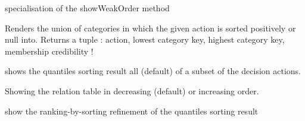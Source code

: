 \documentclass[letterpaper,10pt,english]{sphinxmanual}
\begin{document}
\begin{fulllineitems}
\begin{fulllineitems}
\label{techDoc:weakOrders.QsRbcWeakOrdering.computeWeakOrder}
specialisation of the showWeakOrder method

\end{fulllineitems}


\begin{fulllineitems}
\label{techDoc:weakOrders.QsRbcWeakOrdering.showActionCategories}
Renders the union of categories in which the given action is sorted positively or null into.
Returns a tuple : action, lowest category key, highest category key, membership credibility !

\end{fulllineitems}


\begin{fulllineitems}
\label{techDoc:weakOrders.QsRbcWeakOrdering.showActionsSortingResult}
shows the quantiles sorting result all (default) of a subset of the decision actions.

\end{fulllineitems}


\begin{fulllineitems}
\label{techDoc:weakOrders.QsRbcWeakOrdering.showOrderedRelationTable}
Showing the relation table in decreasing (default) or increasing order.

\end{fulllineitems}


\begin{fulllineitems}
\label{techDoc:weakOrders.QsRbcWeakOrdering.showQsRbcRanking}
show the ranking-by-sorting refinement of the quantiles sorting result

\end{fulllineitems}


\end{fulllineitems}
\end{document}
